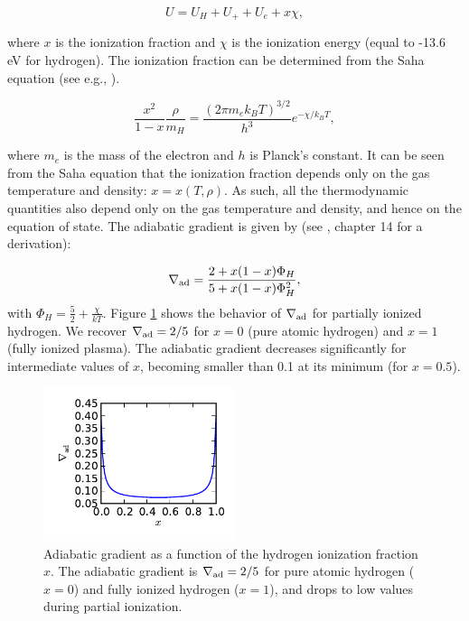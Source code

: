 \documentclass[apj]{emulateapj}
\newcommand{\delad}{\nabla_{\rm ad}}
\begin{document}
\begin{equation}
U=U_H+U_+ + U_e + x \chi,
\end{equation}

\noindent where $x$ is the ionization fraction and $\chi$ is the ionization energy (equal to -13.6 eV for hydrogen). The ionization fraction can be determined from the Saha equation (see e.g., \citealt{kippenhahn90}).

\begin{equation}
\label{eq:saha}
\frac{x^2}{1-x} \frac{\rho}{m_H}=\frac{(2 \pi m_e k_B T)^{3/2}}{h^3} e^{-\chi/k_B T},
\end{equation}

\noindent where $m_e$ is the mass of the electron and $h$ is Planck's constant. It can be seen from the Saha equation that the ionization fraction depends only on the gas temperature and density: $x=x(T, \rho)$. As such, all the thermodynamic quantities also depend only on the gas temperature and density, and hence on the equation of state. The adiabatic gradient is given by (see \citealt{kippenhahn90}, chapter 14 for a derivation):

\begin{equation}
\delad=\frac{2+x (1-x) \Phi_H}{5+x (1-x) \Phi_H^2},
\end{equation} 
with $\Phi_H=\frac{5}{2}+\frac{\chi}{k T}$. Figure \ref{fig:deladion} shows the behavior of $\delad$ for partially ionized hydrogen. We recover $\delad=2/5$ for $x=0$ (pure atomic hydrogen) and $x=1$ (fully ionized plasma). The adiabatic gradient decreases significantly for intermediate values of $x$, becoming smaller than 0.1 at its minimum (for $x=0.5$). 

\begin{figure}[h]
\centering
\includegraphics[width=0.5\textwidth]{../../figs/ModelAtmospheres/RadSelfGravRealEOS/EOSeffects/delad_ionization.pdf}
\caption{Adiabatic gradient as a function of the hydrogen ionization fraction $x$. The adiabatic gradient is $\delad=2/5$ for pure atomic hydrogen ($x=0$) and fully ionized hydrogen ($x=1$), and drops to low values during partial ionization.}
\label{fig:deladion}
\end{figure}
\end{document}
